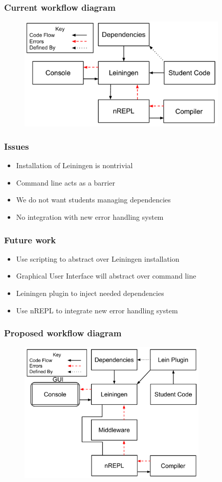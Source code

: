 \documentclass{beamer}
\begin{document}
\begin{frame}[fragile]
\frametitle{Current workflow diagram}
\begin{figure}[h]
 \includegraphics[width=10cm]{../CurrentErrorHandling.pdf}
 \centering
\end{figure}
\end{frame}

\begin{frame}
\frametitle{Issues}
	\begin{itemize}
		\item Installation of Leiningen is nontrivial
		\item Command line acts as a barrier
		\item We do not want students managing dependencies
		\item No integration with new error handling system
	\end{itemize} 
\end{frame}

\begin{frame}
\frametitle{Future work}
	\begin{itemize}
		\item Use scripting to abstract over Leiningen installation
		\item Graphical User Interface will abstract over command line
		\item Leiningen plugin to inject needed dependencies
		\item Use nREPL to integrate new error handling system
	\end{itemize}
\end{frame}

\begin{frame}[fragile]
\frametitle{Proposed workflow diagram}
\begin{figure}[h]
 \includegraphics[width=9cm]{../OurErrorHandlingSystem.pdf}
 \centering
\end{figure}
\end{frame}
\end{document}
